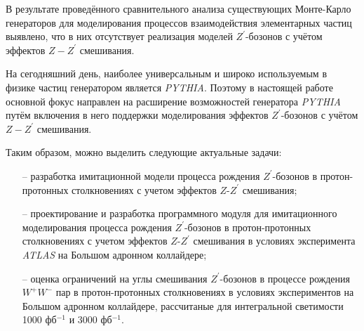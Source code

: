 В результате проведённого сравнительного анализа существующих Монте-Карло генераторов для моделирования процессов взаимодействия элементарных частиц выявлено, что в них отсутствует реализация моделей ${Z}^{\prime}$-бозонов с учётом эффектов $Z-{Z}^{\prime}$ смешивания. 

На сегодняшний день, наиболее универсальным и широко используемым в физике частиц генератором является \textit{PYTHIA}. Поэтому в настоящей работе основной фокус направлен на расширение возможностей генератора \textit{PYTHIA} путём включения в него поддержки моделирования эффектов ${Z}^{\prime}$-бозонов с учётом $Z-{Z}^{\prime}$ смешивания.

Таким образом, можно выделить следующие актуальные задачи:
\begin{enumerate}
	\item[--] разработка имитационной модели процесса рождения ${Z}^{\prime}$-бозонов в протон-протонных столкновениях с учетом эффектов $Z$-${Z}^{\prime}$ смешивания;
	
	\item[--] проектирование и разработка программного модуля для имитационного моделирования процесса
	рождения ${Z}^{\prime}$-бозонов в протон-протонных столкновениях с учетом эффектов $Z$-${Z}^{\prime}$ смешивания в условиях эксперимента \textit{ATLAS} на Большом адронном коллайдере;
	
	\item[--] оценка ограничений на углы смешивания ${Z}^{\prime}$-бозонов в процессе рождения ${W}^{+}$${W}^{-}$ пар в протон-протонных столкновениях
	в условиях экспериментов на Большом адронном коллайдере, рассчитаные для интегральной светимости 1000 фб${}^{−1}$ и 3000 фб${}^{−1}$.
	
\end{enumerate}
